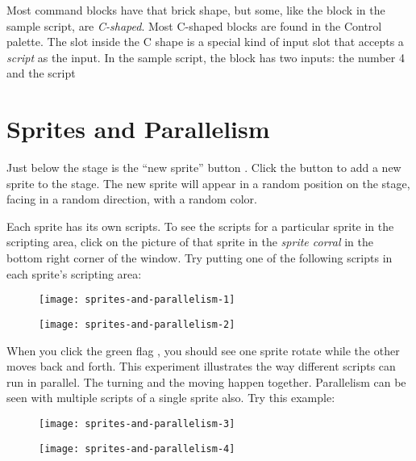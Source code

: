 \documentclass{report}
\begin{document}
Most command blocks have that brick shape, but some, like the  block in the sample script, are \emph{C-shaped}. Most C-shaped blocks are found in the Control palette. The slot inside the C shape is a special kind of input slot that accepts a \emph{script} as the input. In the sample script, the  block has two inputs: the number 4 and the script


\section{Sprites and Parallelism}

Just below the stage is the ``new sprite'' button . Click the button to add a new sprite to the stage. The new sprite will appear in a random position on the stage, facing in a random direction, with a random color.

Each sprite has its own scripts. To see the scripts for a particular sprite in the scripting area, click on the picture of that sprite in the \emph{sprite corral} in the bottom right corner of the window. Try putting one of the following scripts in each sprite's scripting area:

\begin{figure}[H]
\begin{minipage}{0.5\textwidth}
\centering
\texttt{[image: sprites-and-parallelism-1]}
\end{minipage}%
\begin{minipage}{0.5\textwidth}
\centering
\texttt{[image: sprites-and-parallelism-2]}
\end{minipage}
\end{figure}

When you click the green flag , you should see one sprite rotate while the other moves back and forth. This experiment illustrates the way different scripts can run in parallel. The turning and the moving happen together. Parallelism can be seen with multiple scripts of a single sprite also. Try this example:

\begin{figure}[H]
\begin{minipage}{0.5\textwidth}
\centering
\texttt{[image: sprites-and-parallelism-3]}
\end{minipage}%
\begin{minipage}{0.5\textwidth}
\centering
\texttt{[image: sprites-and-parallelism-4]}
\end{minipage}
\end{figure}
\end{document}
